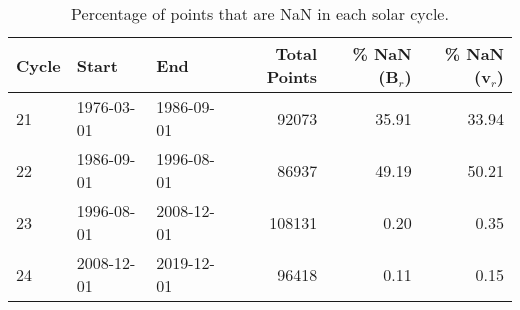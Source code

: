 \begin{table}[h]
\begin{tabular}{lllrrr}
\toprule
Cycle &       Start &         End &  Total Points &  \% NaN (B$_r$) &  \% NaN (v$_r$) \\
\midrule
21  &  1976-03-01 &  1986-09-01 &      92073 &       35.91 &      33.94 \\
22  &  1986-09-01 &  1996-08-01 &      86937 &       49.19 &      50.21 \\
23  &  1996-08-01 &  2008-12-01 &     108131 &        0.20 &       0.35 \\
24  &  2008-12-01 &  2019-12-01 &      96418 &        0.11 &       0.15 \\
\bottomrule
\end{tabular}
\label{table:cycle_checks}
\caption{Percentage of points that are NaN in each solar cycle.}
\end{table}